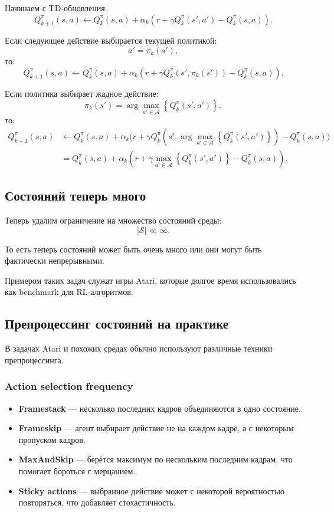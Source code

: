 \documentclass[12pt,a4paper]{article}
\begin{document}
Начинаем с TD-обновления:
\[
Q_{k+1}^{\pi}(s,a)
\leftarrow
Q_k^{\pi}(s,a)
+
\alpha_k
\left(
r
+
\gamma Q_k^{\pi}(s',a')
-
Q_k^{\pi}(s,a)
\right).
\]

Если следующее действие выбирается текущей политикой:
\[
a'=\pi_k(s'),
\]
то:
\[
Q_{k+1}^{\pi}(s,a)
\leftarrow
Q_k^{\pi}(s,a)
+
\alpha_k
\left(
r
+
\gamma Q_k^{\pi}(s',\pi_k(s'))
-
Q_k^{\pi}(s,a)
\right).
\]

Если политика выбирает жадное действие:
\[
\pi_k(s')
=
\arg\max_{a' \in \mathcal A}
\left\{
Q_k^{\pi}(s',a')
\right\},
\]
то:
\[
\begin{aligned}
Q_{k+1}^{\pi}(s,a)
&\leftarrow
Q_k^{\pi}(s,a)
+
\alpha_k
\Bigg(
r
+
\gamma
Q_k^\pi
\left(
s',
\arg\max_{a' \in \mathcal A}
\left\{
Q_k^\pi(s',a')
\right\}
\right)
-
Q_k^\pi(s,a)
\Bigg)
\\
&=
Q_k^\pi(s,a)
+
\alpha_k
\left(
r
+
\gamma
\max_{a' \in \mathcal A}
\left\{
Q_k^\pi(s',a')
\right\}
-
Q_k^\pi(s,a)
\right).
\end{aligned}
\]

\subsection{Состояний теперь много}

Теперь удалим ограничение на множество состояний среды:
\[
|\mathcal S| \ll \infty.
\]

То есть теперь состояний может быть очень много или они могут быть фактически непрерывными.

Примером таких задач служат игры Atari, которые долгое время использовались как benchmark для RL-алгоритмов.

\subsection{Препроцессинг состояний на практике}

В задачах Atari и похожих средах обычно используют различные техники препроцессинга.

\subsubsection{Action selection frequency}

\begin{itemize}
    \item \textbf{Framestack} --- несколько последних кадров объединяются в одно состояние.
    \item \textbf{Frameskip} --- агент выбирает действие не на каждом кадре, а с некоторым пропуском кадров.
    \item \textbf{MaxAndSkip} --- берётся максимум по нескольким последним кадрам, что помогает бороться с мерцанием.
    \item \textbf{Sticky actions} --- выбранное действие может с некоторой вероятностью повторяться, что добавляет стохастичность.
\end{itemize}
\end{document}
